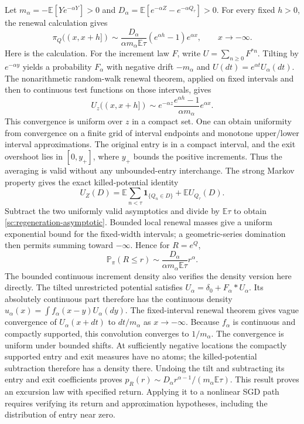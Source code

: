 Let \(m_\alpha=-\mathbb E[Y e^{-\alpha Y}]>0\) and
\(D_\alpha=\mathbb E[e^{-\alpha Z}-e^{-\alpha Q_\tau}]>0\).
For every fixed \(h>0\), the renewal calculation gives
\begin{equation}
 \pi_Q((x,x+h])\sim
 \frac{D_\alpha}{\alpha m_\alpha\mathbb E\tau}
 (e^{\alpha h}-1)e^{\alpha x},\qquad x\to-\infty.
 \label{sc:regeneration-asymptotic}
\end{equation}
Here is the calculation. For the increment law \(F\), write
\(U=\sum_{n\ge0}F^{*n}\). Tilting by \(e^{-\alpha y}\) yields a
probability \(F_\alpha\) with negative drift \(-m_\alpha\) and
\(U(dt)=e^{\alpha t}U_\alpha(dt)\). The nonarithmetic random-walk
renewal theorem, applied on fixed intervals and then to continuous test
functions on those intervals, gives
\[
 U_z((x,x+h])\sim
 e^{-\alpha z}\frac{e^{\alpha h}-1}{\alpha m_\alpha}e^{\alpha x}.
\]
This convergence is uniform over \(z\) in a compact set. One can obtain
uniformity from convergence on a finite grid of interval endpoints and
monotone upper/lower interval approximations. The original entry is in a
compact interval, and the exit overshoot lies in \([0,y_+]\), where
\(y_+\) bounds the positive increments. Thus the averaging is valid
without any unbounded-entry interchange. The strong Markov property gives
the exact killed-potential identity
\[
 U_Z(D)=\mathbb E\sum_{n<\tau}\mathbf1_{\{Q_n\in D\}}
       +\mathbb E U_{Q_\tau}(D).
\]
Subtract the two uniformly valid asymptotics and divide by
\(\mathbb E\tau\) to obtain \eqref{sc:regeneration-asymptotic}.
Bounded local renewal masses give a uniform exponential bound for the
fixed-width intervals; a geometric-series domination then permits
summing toward \(-\infty\). Hence for \(R=e^Q\),
\[
 \mathbb P_\pi(R\le r)\sim
 \frac{D_\alpha}{\alpha m_\alpha\mathbb E\tau}r^\alpha.
\]
The bounded continuous increment density also verifies the density
version here directly. The tilted unrestricted potential satisfies
\(U_\alpha=\delta_0+F_\alpha*U_\alpha\). Its absolutely continuous
part therefore has the continuous density
\(u_\alpha(x)=\int f_\alpha(x-y)U_\alpha(dy)\).
The fixed-interval renewal theorem gives vague convergence of
\(U_\alpha(x+dt)\) to \(dt/m_\alpha\) as \(x\to-\infty\).
Because \(f_\alpha\) is continuous and compactly supported, this
convolution converges to \(1/m_\alpha\). The convergence is uniform
under bounded shifts. At sufficiently negative locations the compactly
supported entry and exit measures have no atoms; the killed-potential
subtraction therefore has a density there. Undoing the tilt and
subtracting its entry and exit coefficients proves
\(p_R(r)\sim D_\alpha r^{\alpha-1}/(m_\alpha\mathbb E\tau)\).
This result proves an excursion law with specified return. Applying it
to a nonlinear SGD path requires verifying its return and approximation
hypotheses, including the distribution of entry near zero.

